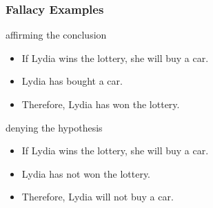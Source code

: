 \documentclass[dvipsnames]{beamer}
\begin{document}
\begin{frame}
  \frametitle{Fallacy Examples}

  \begin{exampleblock}{affirming the conclusion}
    \begin{itemize}
      \item If Lydia wins the lottery, she will buy a car.
      \item Lydia has bought a car.

      \medskip
      \item Therefore, Lydia has won the lottery.
    \end{itemize}
  \end{exampleblock}

  \pause
  \begin{exampleblock}{denying the hypothesis}
    \begin{itemize}
      \item If Lydia wins the lottery, she will buy a car.
      \item Lydia has not won the lottery.

      \medskip
      \item Therefore, Lydia will not buy a car.
    \end{itemize}
  \end{exampleblock}
\end{frame}
\end{document}
